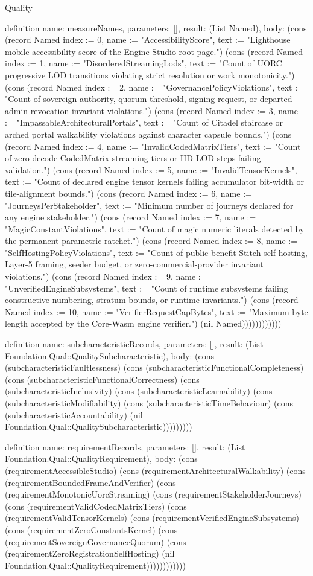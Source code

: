 \begin{lexlean}{Quality}
\begin{semanticmodule}
definition{
  name: measureNames,
  parameters: [],
  result: (List Named),
  body: (cons (record Named {index := 0, name := "AccessibilityScore", text := "Lighthouse mobile accessibility score of the Engine Studio root page."}) (cons (record Named {index := 1, name := "DisorderedStreamingLods", text := "Count of UORC progressive LOD transitions violating strict resolution or work monotonicity."}) (cons (record Named {index := 2, name := "GovernancePolicyViolations", text := "Count of sovereign authority, quorum threshold, signing-request, or departed-admin revocation invariant violations."}) (cons (record Named {index := 3, name := "ImpassableArchitecturalPortals", text := "Count of Citadel staircase or arched portal walkability violations against character capsule bounds."}) (cons (record Named {index := 4, name := "InvalidCodedMatrixTiers", text := "Count of zero-decode CodedMatrix streaming tiers or HD LOD steps failing validation."}) (cons (record Named {index := 5, name := "InvalidTensorKernels", text := "Count of declared engine tensor kernels failing accumulator bit-width or tile-alignment bounds."}) (cons (record Named {index := 6, name := "JourneysPerStakeholder", text := "Minimum number of journeys declared for any engine stakeholder."}) (cons (record Named {index := 7, name := "MagicConstantViolations", text := "Count of magic numeric literals detected by the permanent parametric ratchet."}) (cons (record Named {index := 8, name := "SelfHostingPolicyViolations", text := "Count of public-benefit Stitch self-hosting, Layer-5 framing, seeder budget, or zero-commercial-provider invariant violations."}) (cons (record Named {index := 9, name := "UnverifiedEngineSubsystems", text := "Count of runtime subsystems failing constructive numbering, stratum bounds, or runtime invariants."}) (cons (record Named {index := 10, name := "VerifierRequestCapBytes", text := "Maximum byte length accepted by the Core-Wasm engine verifier."}) (nil Named))))))))))))
}

definition{
  name: subcharacteristicRecords,
  parameters: [],
  result: (List Foundation.Qual::QualitySubcharacteristic),
  body: (cons (subcharacteristicFaultlessness) (cons (subcharacteristicFunctionalCompleteness) (cons (subcharacteristicFunctionalCorrectness) (cons (subcharacteristicInclusivity) (cons (subcharacteristicLearnability) (cons (subcharacteristicModifiability) (cons (subcharacteristicTimeBehaviour) (cons (subcharacteristicAccountability) (nil Foundation.Qual::QualitySubcharacteristic)))))))))
}

definition{
  name: requirementRecords,
  parameters: [],
  result: (List Foundation.Qual::QualityRequirement),
  body: (cons (requirementAccessibleStudio) (cons (requirementArchitecturalWalkability) (cons (requirementBoundedFrameAndVerifier) (cons (requirementMonotonicUorcStreaming) (cons (requirementStakeholderJourneys) (cons (requirementValidCodedMatrixTiers) (cons (requirementValidTensorKernels) (cons (requirementVerifiedEngineSubsystems) (cons (requirementZeroConstantsKernel) (cons (requirementSovereignGovernanceQuorum) (cons (requirementZeroRegistrationSelfHosting) (nil Foundation.Qual::QualityRequirement))))))))))))
}


\end{semanticmodule}
\end{lexlean}
